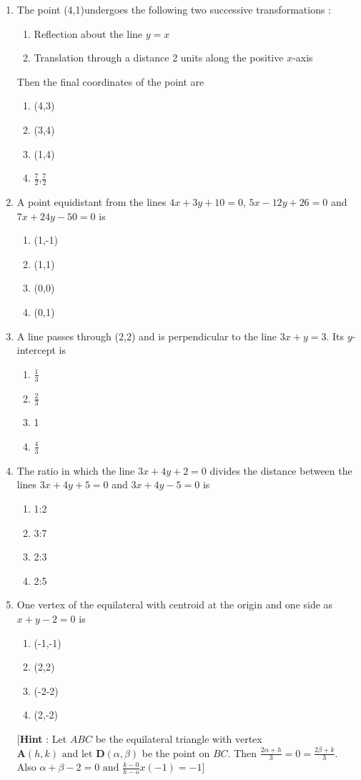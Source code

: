 \documentclass[12pt]{article}
\let\vec\mathbf
\begin{document}
\begin{enumerate}[resume]
\begin{enumerate}
\end{enumerate}
\item The point (4,1)undergoes the following two successive transformations :
\begin{enumerate}
\item Reflection about the line $y=x$
\item Translation through a distance 2 units along the positive $x$-axis 
\end{enumerate}
Then the final coordinates of the point are
\begin{enumerate}
\item (4,3)
\item (3,4)
\item (1,4)
\item $\frac{7}{2}$,$\frac{7}{2}$
\end{enumerate}
\item A point equidistant from the lines $4x+3y+10=0$, $5x-12y+26=0$ and $7x+24y-50=0$ is
\begin{enumerate}
\item (1,-1)
\item (1,1)
\item (0,0)
\item (0,1)
\end{enumerate}
\item A line passes through (2,2) and is perpendicular to the line $3x+y=3$. Its $y$-intercept is 
\begin{enumerate}
\item $\frac{1}{3}$
\item $\frac{2}{3}$
\item 1
\item $\frac{4}{3}$
\end{enumerate}
\item The ratio in which the line $3x+4y+2=0$ divides the distance between the lines $3x+4y+5=0$ and $3x+4y-5=0$ is
\begin{enumerate}
\item 1:2
\item 3:7
\item 2:3
\item 2:5
\end{enumerate}
\item One vertex of the equilateral with centroid at the origin and one side as $x+y-2=0$ is
\begin{enumerate}
\item (-1,-1)
\item (2,2)
\item (-2-2)
\item (2,-2)
\end{enumerate}
[\textbf{Hint} : Let $ABC$ be the equilateral triangle with vertex $\vec{A}(h,k)\text{ and let }\vec{D}(\alpha,\beta)$ be the point on $BC$. Then $\frac{2\alpha+h}{3}=0=\frac{2\beta+k}{3}$. Also ${\alpha+\beta-2=0}\text{ and }\frac{k-0}{h-o}x(-1)=-1$] 
\end{enumerate}
\end{document}
